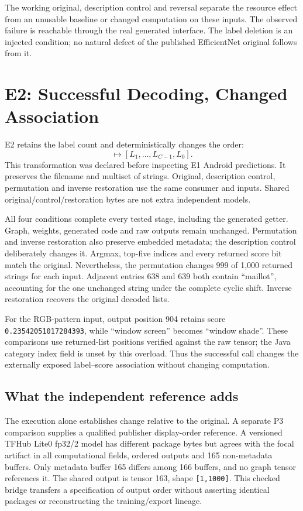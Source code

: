 \documentclass[10pt,conference]{IEEEtran}
\newcommand{\code}[1]{\texttt{#1}}
\begin{document}
The working original, description control and reversal separate the resource effect from an unusable baseline or changed computation on these inputs. The observed failure is reachable through the real generated interface. The label deletion is an injected condition; no natural defect of the published EfficientNet original follows from it.

\section{E2: Successful Decoding, Changed Association}
\label{sec:e2}
E2 retains the label count and deterministically changes the order:
\begin{equation}
[L_0,L_1,\ldots,L_{C-1}]
\mapsto[L_1,\ldots,L_{C-1},L_0].
\end{equation}
This transformation was declared before inspecting E1 Android predictions. It preserves the filename and multiset of strings. Original, description control, permutation and inverse restoration use the same consumer and inputs. Shared original/control/restoration bytes are not extra independent models.

All four conditions complete every tested stage, including the generated getter. Graph, weights, generated code and raw outputs remain unchanged. Permutation and inverse restoration also preserve embedded metadata; the description control deliberately changes it. Argmax, top-five indices and every returned score bit match the original. Nevertheless, the permutation changes 999 of 1,000 returned strings for each input. Adjacent entries 638 and 639 both contain ``maillot'', accounting for the one unchanged string under the complete cyclic shift. Inverse restoration recovers the original decoded lists.

For the RGB-pattern input, output position 904 retains score \code{0.23542051017284393}, while ``window screen'' becomes ``window shade''. These comparisons use returned-list positions verified against the raw tensor; the Java category index field is unset by this overload. Thus the successful call changes the externally exposed label--score association without changing computation.

\subsection{What the independent reference adds}
\label{sec:p3}
The execution alone establishes change relative to the original. A separate P3 comparison supplies a qualified publisher display-order reference. A versioned TFHub Lite0 fp32/2 model has different package bytes but agrees with the focal artifact in all computational fields, ordered outputs and 165 non-metadata buffers. Only metadata buffer 165 differs among 166 buffers, and no graph tensor references it. The shared output is tensor 163, shape \code{[1,1000]}. This checked bridge transfers a specification of output order without asserting identical packages or reconstructing the training/export lineage.
\end{document}
